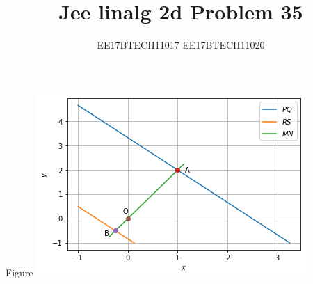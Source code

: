 \documentclass{beamer}
\title{Jee linalg 2d Problem 35}
\author{EE17BTECH11017  EE17BTECH11020}
\date{}
\begin{document}
\begin{frame}{Figure}
\centering
\includegraphics[scale=0.7]{figure.png}
\end{frame}
\end{document}
